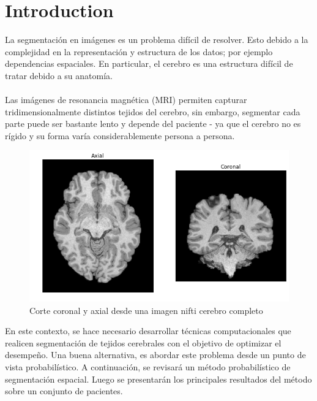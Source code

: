 \documentclass[conference]{IEEEtran}
\begin{document}
\section{Introduction}
La segmentación en imágenes es un problema difícil de resolver. Esto debido a la complejidad en la representación y estructura de los datos; por ejemplo dependencias espaciales. En  particular, el cerebro es una estructura difícil de tratar debido a su anatomía.\\\\Las imágenes de resonancia magnética (MRI) permiten capturar tridimensionalmente distintos tejidos del cerebro, sin embargo, segmentar cada parte puede ser bastante lento y depende del paciente - ya que el cerebro no es rígido y su forma varía considerablemente persona a persona. 
\begin{figure}[h]
\begin{center}
\includegraphics[scale=0.4]{img/brain_real.png} 
\end{center}
\caption{Corte coronal y axial desde una imagen nifti cerebro completo}
\end{figure}
En este contexto, se hace necesario desarrollar técnicas computacionales que realicen segmentación de tejidos cerebrales con el objetivo de optimizar el desempeño. Una buena alternativa, es abordar este problema desde un punto de vista probabilístico. A continuación, se revisará un método probabilístico de segmentación espacial. Luego se presentarán los principales resultados del método sobre un conjunto de pacientes. 
\end{document}
